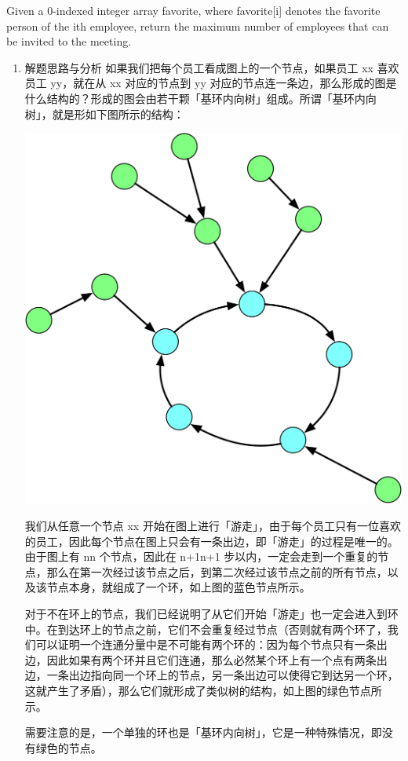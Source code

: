 \documentclass[9pt, b5paaper]{book}
\begin{document}
Given a 0-indexed integer array favorite, where favorite[i] denotes the favorite person of the ith employee, return the maximum number of employees that can be invited to the meeting.
\begin{enumerate}
\item 解题思路与分析
\label{sec-1-2-1-1}
如果我们把每个员工看成图上的一个节点，如果员工 xx 喜欢员工 yy，就在从 xx 对应的节点到 yy 对应的节点连一条边，那么形成的图是什么结构的？形成的图会由若干颗「基环内向树」组成。所谓「基环内向树」，就是形如下图所示的结构：

\includegraphics[width=.9\linewidth]{./pic/2277tree-1.png}


我们从任意一个节点 xx 开始在图上进行「游走」，由于每个员工只有一位喜欢的员工，因此每个节点在图上只会有一条出边，即「游走」的过程是唯一的。由于图上有 nn 个节点，因此在 n+1n+1 步以内，一定会走到一个重复的节点，那么在第一次经过该节点之后，到第二次经过该节点之前的所有节点，以及该节点本身，就组成了一个环，如上图的蓝色节点所示。

对于不在环上的节点，我们已经说明了从它们开始「游走」也一定会进入到环中。在到达环上的节点之前，它们不会重复经过节点（否则就有两个环了，我们可以证明一个连通分量中是不可能有两个环的：因为每个节点只有一条出边，因此如果有两个环并且它们连通，那么必然某个环上有一个点有两条出边，一条出边指向同一个环上的节点，另一条出边可以使得它到达另一个环，这就产生了矛盾），那么它们就形成了类似树的结构，如上图的绿色节点所示。

需要注意的是，一个单独的环也是「基环内向树」，它是一种特殊情况，即没有绿色的节点。


\end{enumerate}
\end{document}
